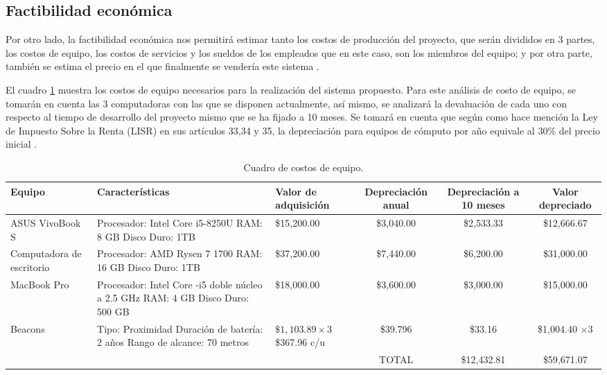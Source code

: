 \subsection{Factibilidad económica}
Por otro lado, la factibilidad económica nos permitirá estimar tanto los costos de producción del proyecto, que serán divididos en 3 partes, los costos de equipo, los costos de servicios y los sueldos de los empleados que en este caso, son los miembros del equipo; y por otra parte, también se estima el precio en el que finalmente se vendería este sistema \cite{Factibilidad1}.
\\ \par 
El cuadro \ref{costos equipo} muestra los costos de equipo necesarios para la realización del sistema propuesto. Para este análisis de costo de equipo, se tomarán en cuenta las 3 computadoras con las que se disponen actualmente, así mismo, se analizará la devaluación de cada uno con respecto al tiempo de desarrollo del proyecto mismo que se ha fijado a 10 meses.
Se tomará en cuenta que según como hace mención la Ley de Impuesto Sobre la Renta (LISR) en sus artículos 33,34 y 35, la depreciación para equipos de cómputo por año equivale al 30\% del precio inicial  \cite{Factibilidad2}.

\FloatBarrier
\begin{table}[htb]
\setlength\extrarowheight{2pt} %
\begin{tabularx}{\textwidth}{| >{\centering\arraybackslash}m{1in} | >{\centering\arraybackslash}m{1in} | >{\centering\arraybackslash}m{1in} |C|C|C|}
\hline
\textbf{Equipo} & \textbf{Características} &
\textbf{Valor de adquisición} & \textbf{Depreciación anual} & \textbf{Depreciación a 10 meses} & \textbf{Valor depreciado}
\\ \hline
ASUS VivoBook S & Procesador: Intel Core i5-8250U \newline RAM: 8 GB \newline Disco Duro: 1TB & \$15,200.00 & \$3,040.00 & \$2,533.33 & \$12,666.67
\\ \hline
Computadora de escritorio & Procesador: AMD Rysen 7 1700 \newline RAM: 16 GB \newline Disco Duro: 1TB & \$37,200.00 & \$7,440.00 & \$6,200.00 & \$31,000.00
\\ \hline
MacBook Pro & Procesador: Intel Core -i5 doble núcleo a 2.5 GHz \newline RAM: 4 GB \newline Disco Duro: 500 GB & \$18,000.00 & \$3,600.00 &  \$3,000.00 & \$15,000.00
\\ \hline
Beacons & Tipo: Proximidad \newline Duración de batería: 2 años \newline Rango de alcance: 70 metros & $\$1,103.89 \times 3$ \$367.96 c/u & \$39.796  & \$33.16 & \$1,004.40 $\times 3$
\\ \hline
 & & & TOTAL & \$12,432.81 & \$59,671.07
\\ \hline
\end{tabularx}
\caption{Cuadro de costos de equipo.}
\label{costos equipo}
\end{table}
\FloatBarrier

